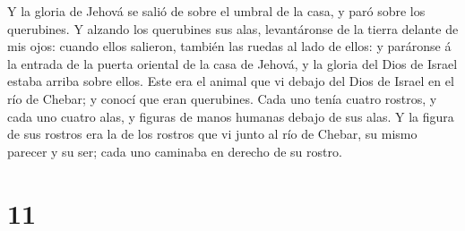  Y la gloria de Jehová se salió de sobre el umbral de la
casa, y paró sobre los querubines.  Y alzando los
querubines sus alas, levantáronse de la tierra delante de mis ojos:
cuando ellos salieron, también las ruedas al lado de ellos: y paráronse
á la entrada de la puerta oriental de la casa de Jehová, y la gloria del
Dios de Israel estaba arriba sobre ellos.  Este era el
animal que vi debajo del Dios de Israel en el río de Chebar; y conocí
que eran querubines.  Cada uno tenía cuatro rostros, y
cada uno cuatro alas, y figuras de manos humanas debajo de sus alas.
 Y la figura de sus rostros era la de los rostros que vi
junto al río de Chebar, su mismo parecer y su ser; cada uno caminaba en
derecho de su rostro.

\hypertarget{section-10}{%
\section{11}\label{section-10}}

